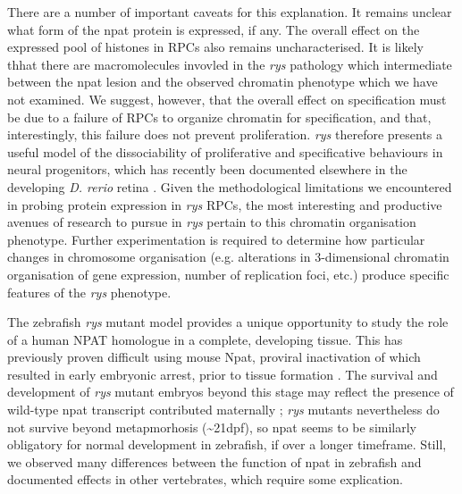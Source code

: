 There are a number of important caveats for this explanation. It remains unclear what form of the npat protein is expressed, if any. The overall effect on the expressed pool of histones in RPCs also remains uncharacterised. It is likely thhat there are macromolecules invovled in the \textit{rys} pathology which intermediate between the npat lesion and the observed chromatin phenotype which we have not examined. We suggest, however, that the overall effect on specification must be due to a failure of RPCs to organize chromatin for specification, and that, interestingly, this failure does not prevent proliferation. \textit{rys} therefore presents a useful model of the dissociability of proliferative and specificative behaviours in neural progenitors, which has recently been documented elsewhere in the developing \textit{D. rerio} retina \cite{Engerer2017}. Given the methodological limitations we encountered in probing protein expression in \textit{rys} RPCs, the most interesting and productive avenues of research to pursue in \textit{rys} pertain to this chromatin organisation phenotype.  Further experimentation is required to determine how particular changes in chromosome organisation (e.g. alterations in 3-dimensional chromatin organisation of gene expression, number of replication foci, etc.) produce specific features of the \textit{rys} phenotype. 

The zebrafish \textit{rys} mutant model provides a unique opportunity to study the role of a human NPAT homologue in a complete, developing tissue. This has previously proven difficult using mouse Npat, proviral inactivation of which resulted in early embryonic arrest, prior to tissue formation \cite{DiFruscio1997}. The survival and development of \textit{rys} mutant embryos beyond this stage may reflect the presence of wild-type npat transcript contributed maternally \cite{Harvey2013}; \textit{rys} mutants nevertheless do not survive beyond metapmorhosis (\textasciitilde{}21dpf), so npat seems to be similarly obligatory for normal development in zebrafish, if over a longer timeframe. Still, we observed many differences between the function of npat in zebrafish and documented effects in other vertebrates, which require some explication.

